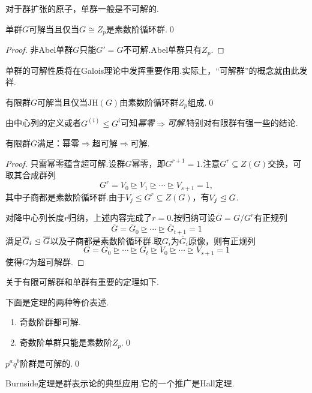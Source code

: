 对于群扩张的原子，单群一般是不可解的.
\begin{prop}
	单群$G$可解当且仅当$G\cong Z_p$是素数阶循环群.\qed
\end{prop}
\begin{proof}
	非Abel单群$G$只能$G'=G$不可解.Abel单群只有$Z_p$.
\end{proof}
\begin{remark}
	单群的可解性质将在Galois理论中发挥重要作用.实际上，“可解群”的概念就由此发祥.%
\end{remark}
\begin{cor*}
	有限群$G$可解当且仅当$\mathrm{JH}(G)$由素数阶循环群$Z_p$组成.\qed
\end{cor*}

由中心列的定义或者$G^{(i)}\le G^i$可知\emph{幂零}$\Rightarrow$\emph{可解}.特别对有限群有强一些的结论.
\begin{prop}
	有限群$G$满足：幂零$\Rightarrow$超可解$\Rightarrow$可解.
\end{prop}
\begin{proof}
	只需幂零蕴含超可解.设群$G$幂零，即$G^{r+1}=1$.注意$G^r\subseteq Z(G)$交换，可取其合成群列
	\[
		G^r=V_0\trianglerighteq V_1\trianglerighteq\cdots\trianglerighteq V_{s+1}=1,
	\]
	其中子商都是素数阶循环群.由于$V_j\le G^r\subseteq Z(G)$，有$V_j\trianglelefteq G$.
	
	对降中心列长度$r$归纳，上述内容完成了$r=0$.按归纳可设$\overline{G}=G/G^r$有正规列
	\[
		\overline{G}=\overline{G}_0\trianglerighteq\cdots\trianglerighteq\overline{G}_{t+1}=1
	\]
	满足$\overline{G}_i\trianglelefteq\overline{G}$以及子商都是素数阶循环群.取$G_i$为$\overline{G}_i$原像，则有正规列
	\[
		G=G_0\trianglerighteq\cdots\trianglerighteq G_t\trianglerighteq V_0\trianglerighteq\cdots\trianglerighteq V_{s+1}=1
	\]
	使得$G$为超可解群.
\end{proof}

关于有限可解群和单群有重要的定理如下.
\begin{thm}
	下面是定理的两种等价表述.
	\begin{enumerate}
		\item 奇数阶群都可解.
		\item 奇数阶单群只能是素数阶$Z_p$.\qed
	\end{enumerate}
\end{thm}
\begin{thm}[(Burnside)]
	$p^aq^b$阶群是可解的.\qed
\end{thm}
\begin{remark}
	Burnside定理是群表示论的典型应用.它的一个推广是Hall定理.%
\end{remark}

